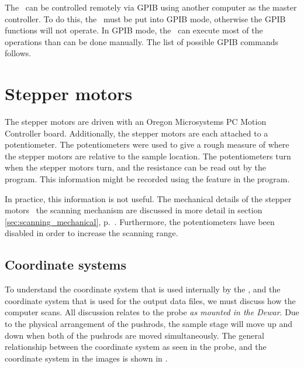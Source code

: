 The \squidbox\ can be controlled remotely
via GPIB using another computer as the master controller. To do this, the 
\squidbox\ must be put into GPIB mode, otherwise the
GPIB functions will not operate.
In GPIB mode, the \squidbox\ can execute most of the operations
than can be done manually. The list of possible GPIB commands follows. 



\section{Stepper motors}
\label{steppermotors}
The stepper motors are driven with an
Oregon Microsystems PC Motion Controller board\cite{oregon_microsystems}.
Additionally, the stepper motors are each attached to a potentiometer.
The potentiometers were used to give a rough measure of where the 
stepper motors are relative to the sample location. The potentiometers
turn when the stepper motors turn, and the resistance can be read
out by the program. This information might be 
recorded using the  feature in the program. 

In practice,
this information is not useful. 
The mechanical details of the stepper motors \visavis\ the scanning
mechanism are discussed in more detail in section 
\ref{sec:scanning_mechanical}, p.~\pageref{sec:scanning_mechanical}. 
Furthermore, the potentiometers have been disabled in order
to increase the scanning range. 

\subsection{Coordinate systems}

To understand the coordinate system that is used internally by the
\squidbox, and the coordinate system that is used for the output
data files, we must discuss how the computer scans. 
All discussion relates to the probe
\emph{as mounted in the Dewar}.
Due to the physical arrangement
of the pushrods, the sample stage will move up and down when
both of the pushrods are moved simultaneously. The general 
relationship between the coordinate system as seen in the probe,
and the coordinate system in the images is shown in 
.

